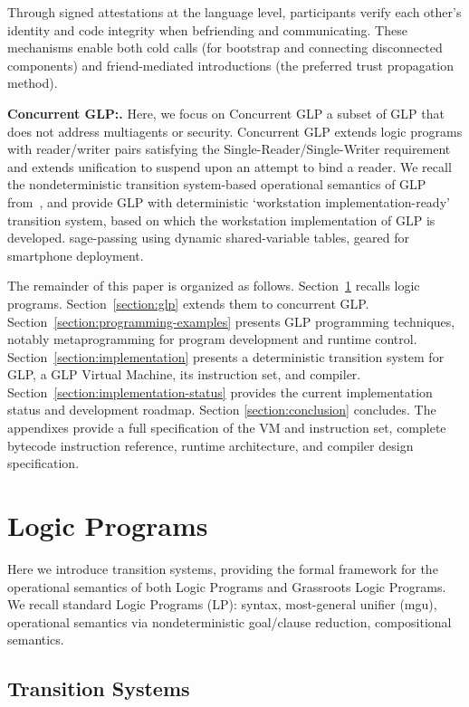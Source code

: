\documentclass[runningheads,thm-restate]{llncs}
\newcommand{\mypara}[1]{\smallskip\noindent\textbf{#1.}}
\begin{document}
Through signed attestations at the language level, participants verify each other's identity and code integrity when befriending and communicating. These mechanisms enable both cold calls (for bootstrap and connecting disconnected components) and friend-mediated introductions (the preferred trust propagation method).

\mypara{Concurrent GLP:} Here, we focus on Concurrent GLP a subset of GLP that does not address multiagents or security.  Concurrent GLP  extends logic programs with reader/writer pairs satisfying  the Single-Reader/Single-Writer requirement and extends unification to suspend upon an attempt to bind a reader.  We recall the nondeterministic transition system-based operational semantics of GLP from~\cite{shapiro2025glp}, and provide GLP with deterministic `workstation implementation-ready' transition system, based on which the workstation implementation of GLP is  developed.
sage-passing using dynamic shared-variable tables, geared for smartphone deployment.


The remainder of this paper is organized as follows. Section~\ref{section:lp} recalls logic programs. Section~\ref{section:glp} extends them to concurrent GLP. Section~\ref{section:programming-examples} presents  GLP programming techniques, notably metaprogramming for program development and runtime control.
Section~\ref{section:implementation} presents  a deterministic transition system for GLP, a GLP Virtual Machine, its instruction set, and compiler.
Section~\ref{section:implementation-status} provides the current implementation status and development roadmap.
Section \ref{section:conclusion} concludes.
The appendixes provide a full specification of the VM and instruction set, complete bytecode instruction reference, runtime architecture, and compiler design specification.

\section{Logic Programs}\label{section:lp}

Here we introduce transition systems, providing the formal framework for the operational semantics of both Logic Programs and Grassroots Logic Programs.
We recall standard Logic Programs (LP): syntax, most-general unifier (mgu), operational semantics via nondeterministic goal/clause reduction, compositional semantics. 

\subsection{Transition Systems}
\end{document}

